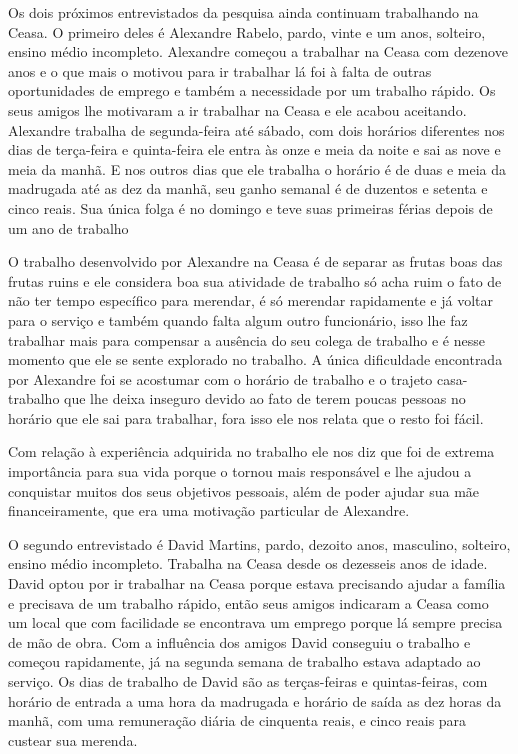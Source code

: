  Os dois próximos entrevistados da pesquisa ainda continuam trabalhando na Ceasa. O primeiro deles é Alexandre
 Rabelo, pardo, vinte e um anos, solteiro, ensino médio incompleto. Alexandre começou a trabalhar na Ceasa com 
 dezenove anos e o que mais o motivou para ir trabalhar lá foi à falta de outras oportunidades de emprego e 
 também a necessidade por um trabalho rápido. Os seus amigos lhe motivaram a ir trabalhar na Ceasa e ele acabou 
 aceitando. Alexandre trabalha de segunda-feira até sábado, com dois horários diferentes nos dias de terça-feira
 e quinta-feira ele entra às onze e meia da noite e sai as nove e meia da manhã. E nos outros dias que ele trabalha 
 o horário é de duas e meia da madrugada até as dez da manhã, seu ganho semanal é de duzentos e setenta e cinco reais. 
 Sua única folga é no domingo e teve suas primeiras férias depois de um ano de trabalho

 O trabalho desenvolvido por Alexandre na Ceasa é de separar as frutas boas das 
frutas ruins e ele considera boa sua atividade de trabalho só acha ruim o fato 
de não ter tempo específico para merendar, é só merendar rapidamente e já voltar 
para o serviço e também quando falta algum outro funcionário, isso lhe faz 
trabalhar mais para compensar a ausência do seu colega de trabalho e é nesse 
momento que ele se sente explorado no trabalho. A única dificuldade encontrada 
por Alexandre foi se acostumar com o horário de trabalho e o trajeto 
casa-trabalho que lhe deixa inseguro devido ao fato de terem poucas pessoas no 
horário que ele sai para trabalhar, fora isso ele nos relata que o resto foi 
fácil.

 Com relação à experiência adquirida no trabalho ele nos diz que foi de extrema 
importância para sua vida porque o tornou mais responsável e lhe ajudou a 
conquistar muitos dos seus objetivos pessoais, além de poder ajudar sua mãe 
financeiramente, que era uma motivação particular de Alexandre.

 O segundo entrevistado é David Martins, pardo, dezoito anos, masculino, 
solteiro, ensino médio incompleto. Trabalha na Ceasa desde os dezesseis anos de 
idade. David optou por ir trabalhar na Ceasa porque estava precisando ajudar a 
família e precisava de um trabalho rápido, então seus amigos indicaram a Ceasa 
como um local que com facilidade se encontrava um emprego porque lá sempre 
precisa de mão de obra. Com a influência dos amigos David conseguiu o trabalho e 
começou rapidamente, já na segunda semana de trabalho estava adaptado ao 
serviço. Os dias de trabalho de David são as terças-feiras e quintas-feiras, com 
horário de entrada a uma hora da madrugada e horário de saída as dez horas da 
manhã, com uma remuneração diária de cinquenta reais, e cinco reais para custear 
sua merenda.

